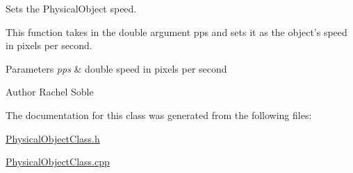 Sets the Physical\-Object speed. 

This function takes in the double argument pps and sets it as the object's speed in pixels per second.


\begin{DoxyParams}{Parameters}
{\em pps} & double speed in pixels per second\\
\hline
\end{DoxyParams}
\begin{DoxyAuthor}{Author}
Rachel Soble 
\end{DoxyAuthor}


The documentation for this class was generated from the following files\-:\begin{DoxyCompactItemize}
\item 
\hyperlink{PhysicalObjectClass_8h}{Physical\-Object\-Class.\-h}\item 
\hyperlink{PhysicalObjectClass_8cpp}{Physical\-Object\-Class.\-cpp}\end{DoxyCompactItemize}
